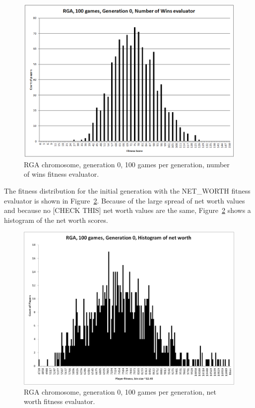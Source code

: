 \begin{figure}[htbp]
\centerline{\includegraphics[width=0.75\columnwidth]{Figures/RGA_1024_G000_N100_NW.png}}
\caption[RGA Fitness Distribution, Initial Generation]{RGA chromosome,
generation 0, 100 games per generation, number of wins fitness evaluator.}
\label{figure-RGA-G000-N100-NW-initial_fitness}
\end{figure}

The fitness distribution for the initial generation with the NET\_WORTH fitness
evaluator is shown in Figure~\ref{figure-RGA-G000-N100-NetW-initial_fitness}.
Because of the large spread of net worth values and because no [CHECK THIS] net
worth values are the same,
Figure~\ref{figure-RGA-G000-N100-NetW-initial_fitness} shows a histogram of the
net worth scores.

\begin{figure}[htbp]
\centerline{\includegraphics[width=0.75\columnwidth]{Figures/RGA_1024_G000_N100_NetW.png}}
\caption[RGA Fitness Distribution, Initial Generation]{RGA chromosome,
generation 0, 100 games per generation, net worth fitness evaluator.}
\label{figure-RGA-G000-N100-NetW-initial_fitness}
\end{figure}

